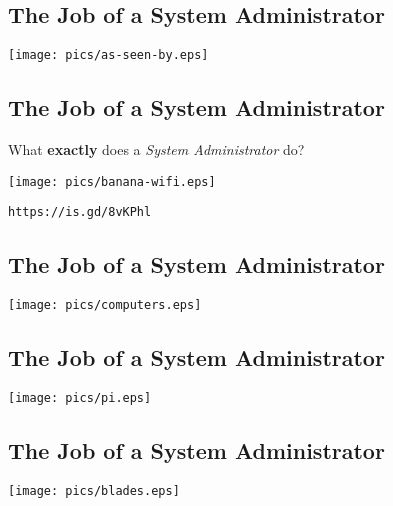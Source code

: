 \documentclass[xga]{xdvislides}
\begin{document}
\subsection{The Job of a System Administrator}
\vspace*{\fill}
\begin{center}
	\texttt{[image: pics/as-seen-by.eps]} \\
\end{center}
\vspace*{\fill}

\subsection{The Job of a System Administrator}
What {\bf exactly} does a {\em System Administrator} do?
\vspace*{\fill}
\begin{center}
	\texttt{[image: pics/banana-wifi.eps]} \\
\end{center}
\vspace*{\fill}
{\tt https://is.gd/8vKPhl}

\subsection{The Job of a System Administrator}
\begin{center}
	\texttt{[image: pics/computers.eps]} \\
\end{center}

\subsection{The Job of a System Administrator}
\vspace*{\fill}
\begin{center}
	\texttt{[image: pics/pi.eps]} \\
\end{center}
\vspace*{\fill}

\subsection{The Job of a System Administrator}
\vspace*{\fill}
\begin{center}
	\texttt{[image: pics/blades.eps]} \\
\end{center}
\vspace*{\fill}
\end{document}
